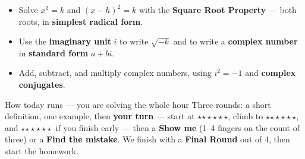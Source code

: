 \documentclass[aspectratio=169, 11pt]{beamer}
\newcommand{\rung}[1]{{\color{goldacc}\ifcase#1\or$\star$\or$\star\star$\or$\star\star\star$\fi}}
\begin{document}
\begin{frame}[t, plain]
  \begin{itemize}\setlength{\itemsep}{4pt}
    \item Solve $x^2=k$ and $(x-h)^2=k$ with the \textbf{Square Root Property} --- both roots, in
          \textbf{simplest radical form}.
    \item Use the \textbf{imaginary unit} $i$ to write $\sqrt{-k}$ and to write a
          \textbf{complex number} in \textbf{standard form} $a+bi$.
    \item Add, subtract, and multiply complex numbers, using $i^2=-1$ and
          \textbf{complex conjugates}.
  \end{itemize}
  \vspace{3pt}
  \begin{block}{How today runs --- you are solving the whole hour}
    Three rounds: a short definition, one example, then \textbf{your turn} --- start at
    \rung1, climb to \rung2, and \rung3\ if you finish early --- then a \textbf{Show me} (1--4
    fingers on the count of three) or a \textbf{Find the mistake}. We finish with a
    \textbf{Final Round} out of 4, then start the homework.
  \end{block}
\end{frame}
\end{document}
